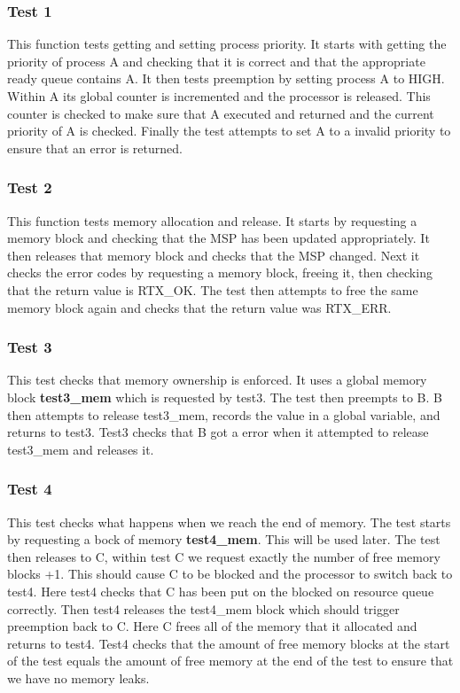 \documentclass[11pt, oneside]{article}
\begin{document}
\subsubsection{Test 1}
This function tests getting and setting process priority. It starts with getting the priority of process A and checking that it is correct and that the appropriate ready queue contains A. It then tests preemption by setting process A to HIGH. Within A its global counter is incremented and the processor is released. This counter is checked to make sure that A executed and returned and the current priority of A is checked. Finally the test attempts to set A to a invalid priority to ensure that an error is returned.
\subsubsection{Test 2}
This function tests memory allocation and release. It starts by requesting a memory block and checking that the MSP has been updated appropriately. It then releases that memory block and checks that the MSP changed. Next it checks the error codes by requesting a memory block, freeing it, then checking that the return value is RTX\_OK. The test then attempts to free the same memory block again and checks that the return value was RTX\_ERR.
\subsubsection{Test 3}
This test checks that memory ownership is enforced. It uses a global memory block \textbf{test3\_mem} which is requested by test3. The test then preempts to B. B then attempts to release test3\_mem, records the value in a global variable, and returns to test3. Test3 checks that B got a error when it attempted to release test3\_mem and releases it.
\subsubsection{Test 4}
This test checks what happens when we reach the end of memory. The test starts by requesting a bock of memory \textbf{test4\_mem}. This will be used later. The test then releases to C, within test C we request exactly the number of free memory blocks +1. This should cause C to be blocked and the processor to switch back to test4. Here test4 checks that C has been put on the blocked on resource queue correctly. Then test4 releases the test4\_mem block which should trigger preemption back to C. Here C frees all of the memory that it allocated and returns to test4. Test4 checks that the amount of free memory blocks at the start of the test equals the amount of free memory at the end of the test to ensure that we have no memory leaks.
\end{document}

